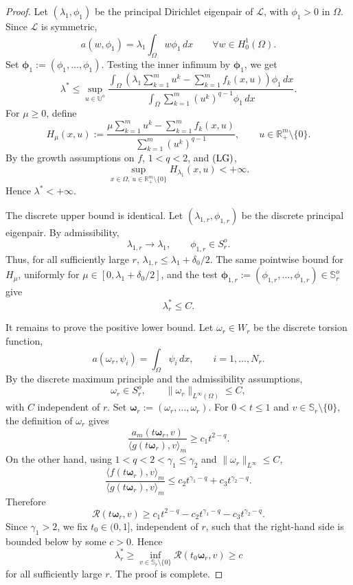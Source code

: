 \documentclass[preprint,10pt]{elsarticle}
\numberwithin{equation}{section}
\begin{document}
\begin{proof}
	Let \((\lambda_1,\phi_1)\) be the principal Dirichlet eigenpair of
	\(\mathcal L\), with \(\phi_1>0\) in \(\Omega\). Since \(\mathcal L\) is
	symmetric,
	\[
	a(w,\phi_1)=\lambda_1\int_\Omega w\phi_1\,dx
	\qquad \forall w\in H_0^1(\Omega).
	\]
	Set \(\boldsymbol\phi_1:=(\phi_1,\ldots,\phi_1)\). Testing the inner
	infimum by \(\boldsymbol\phi_1\), we get
	\[
	\lambda^*
	\le
	\sup_{u\in\mathbb U^o}
	\frac{
		\displaystyle
		\int_\Omega
		\left(
		\lambda_1\sum_{k=1}^m u^k
		-
		\sum_{k=1}^m f_k(x,u)
		\right)\phi_1\,dx
	}{
		\displaystyle
		\int_\Omega
		\sum_{k=1}^m (u^k)^{q-1}\phi_1\,dx
	}.
	\]
	For \(\mu\ge0\), define
	\[
	H_\mu(x,u):=
	\frac{
		\mu\sum_{k=1}^m u^k-\sum_{k=1}^m f_k(x,u)
	}{
		\sum_{k=1}^m (u^k)^{q-1}
	},
	\qquad
	u\in\mathbb R_+^m\setminus\{0\}.
	\]
	By the growth assumptions on \(f\), \(1<q<2\), and \({\rm (LG)}\),
	\[
	\sup_{x\in\Omega,\ u\in\mathbb R_+^m\setminus\{0\}}
	H_{\lambda_1}(x,u)<+\infty .
	\]
	Hence \(\lambda^*<+\infty\).
	
	The discrete upper bound is identical. Let
	\((\lambda_{1,r},\phi_{1,r})\) be the discrete principal eigenpair. By
	admissibility,
	\[
	\lambda_{1,r}\to\lambda_1,
	\qquad
	\phi_{1,r}\in S_r^o .
	\]
	Thus, for all sufficiently large \(r\),
	\(\lambda_{1,r}\le\lambda_1+\delta_0/2\). The same pointwise bound for
	\(H_\mu\), uniformly for
	\(\mu\in[0,\lambda_1+\delta_0/2]\), and the test
	\(\boldsymbol\phi_{1,r}:=(\phi_{1,r},\ldots,\phi_{1,r})\in\mathbb S_r^o\)
	give
	\[
	\lambda_r^*\le C .
	\]
	
	It remains to prove the positive lower bound. Let \(\omega_r\in W_r\) be
	the discrete torsion function,
	\[
	a(\omega_r,\psi_i)=\int_\Omega\psi_i\,dx,
	\qquad i=1,\ldots,N_r .
	\]
	By the discrete maximum principle and the admissibility assumptions,
	\[
	\omega_r\in S_r^o,
	\qquad
	\|\omega_r\|_{L^\infty(\Omega)}\le C ,
	\]
	with \(C\) independent of \(r\). Set
	\(\boldsymbol\omega_r:=(\omega_r,\ldots,\omega_r)\). For
	\(0<t\le1\) and \(v\in\mathbb S_r\setminus\{0\}\), the definition of
	\(\omega_r\) gives
	\[
	\frac{a_m(t\boldsymbol\omega_r,v)}
	{\langle g(t\boldsymbol\omega_r),v\rangle_m}
	\ge c_1t^{2-q}.
	\]
	On the other hand, using
	\(1<q<2<\gamma_1\le\gamma_2\) and
	\(\|\omega_r\|_{L^\infty}\le C\),
	\[
	\frac{\langle f(t\boldsymbol\omega_r),v\rangle_m}
	{\langle g(t\boldsymbol\omega_r),v\rangle_m}
	\le
	c_2t^{\gamma_1-q}+c_3t^{\gamma_2-q}.
	\]
	Therefore
	\[
	\mathcal R(t\boldsymbol\omega_r,v)
	\ge
	c_1t^{2-q}
	-
	c_2t^{\gamma_1-q}
	-
	c_3t^{\gamma_2-q}.
	\]
	Since \(\gamma_1>2\), we fix \(t_0\in(0,1]\), independent of \(r\), such
	that the right-hand side is bounded below by some \(c>0\). Hence
	\[
	\lambda_r^*
	\ge
	\inf_{v\in\mathbb S_r\setminus\{0\}}
	\mathcal R(t_0\boldsymbol\omega_r,v)
	\ge c
	\]
	for all sufficiently large \(r\). The proof is complete.
\end{proof}
\end{document}
